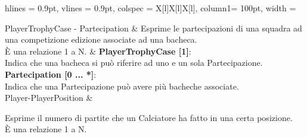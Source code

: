 \begin{tblr}{
    hlines = {0.9pt}, vlines = {0.9pt}, colspec = {X[l]X[l]X[l]}, column{1}= {100pt},
    width = \textwidth
}

	{
		PlayerTrophyCase - Partecipation
	}
	&
	{
		Esprime le partecipazioni di una squadra
		ad una competizione edizione associate
		ad una bacheca.\\
		È una relazione 1 a N.
	}
	&
	{
		\textbf{PlayerTrophyCase [1]}:\\Indica che una bacheca
			si può riferire ad uno e un sola Partecipazione.
		\medskip\textbf{Partecipation [0 ... *]}:\\Indica che
			una Partecipazione può avere più bacheche associate.
	}
	\\
	{
		Player-PlayerPosition
	}
	&
	{
		Esprime il numero di partite che un Calciatore
		ha fatto in una certa posizione.\\
		È una relazione 1 a N.
		
}
\end{tblr}
